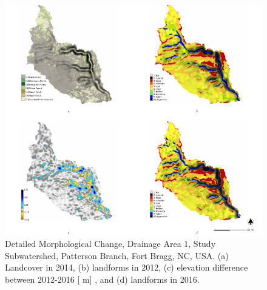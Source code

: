 \documentclass[gmd, manuscript]{copernicus}
\providecommand{\DIFadd}[1]{{\protect\color{blue} \sf #1}} %
\providecommand{\DIFaddbegin}{} %
\providecommand{\DIFaddend}{} %
\providecommand{\DIFaddFL}[1]{\DIFadd{#1}} %
\begin{document}
\DIFaddbegin \begin{figure}
\center
\includegraphics[width=\textwidth,height=0.95\textheight,keepaspectratio]{figures/study_area_detail.pdf}
\caption{\DIFaddFL{Detailed Morphological Change, Drainage Area 1, Study Subwatershed, Patterson Branch, Fort Bragg, NC, USA.
(a) Landcover in 2014, 
(b) landforms in 2012,
(c) elevation difference between 2012-2016 }[\DIFaddFL{m}]\DIFaddFL{, and
(d) landforms in 2016.
}}
\label{fig:study_area_detail}
\end{figure}

\DIFaddend %
\end{document}
